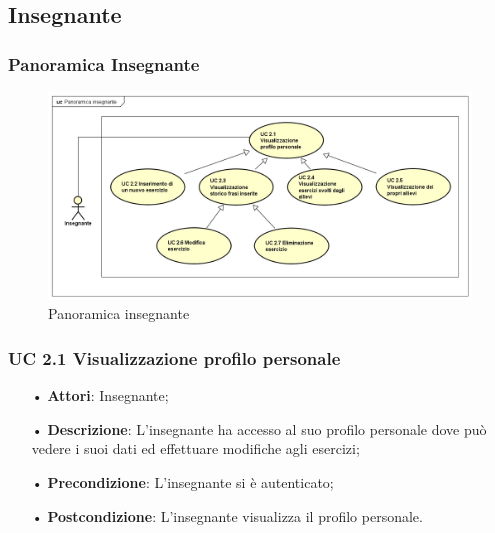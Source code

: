 
\subsection{Insegnante}

\subsubsection{Panoramica Insegnante}

\begin{figure}[H]
\centering
\includegraphics[width=17cm]{img/PanoramicaInsegnanti2.png} 
\caption{Panoramica insegnante}
\end{figure}

\subsubsection{UC 2.1 Visualizzazione profilo personale}


\begin{itemize}
	\item[•] \textbf{Attori}: Insegnante;
	\item[•] \textbf{Descrizione}: L’insegnante ha accesso al suo profilo personale dove può vedere i suoi dati ed effettuare modifiche agli esercizi;

	\item[•] \textbf{Precondizione}: L'insegnante si è autenticato;

	\item[•] \textbf{Postcondizione}: L'insegnante visualizza il profilo personale.

\end{itemize}


